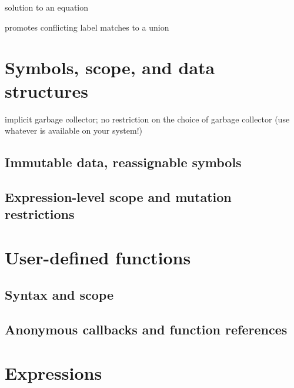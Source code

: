 \documentclass{article}
\theoremstyle{definition}
\begin{document}
solution to an equation

promotes conflicting label matches to a union

\pagebreak

\section{Symbols, scope, and data structures}

implicit garbage collector; no restriction on the choice of garbage collector (use whatever is available on your system!)

\hypertarget{hsec:immutable}{}
\subsection{Immutable data, reassignable symbols}
\label{sec:immutable}

\subsection{Expression-level scope and mutation restrictions}

\pagebreak

\section{User-defined functions}

\hypertarget{hsec:fcndef}{}
\label{form:fcndef}


\hypertarget{hsec:fcnref}{}
\label{form:fcnref}


\subsection{Syntax and scope}

\subsection{Anonymous callbacks and function references}

\pagebreak

\hypertarget{hsec:expressions}{}
\section{Expressions}
\label{sec:expressions}
\end{document}
